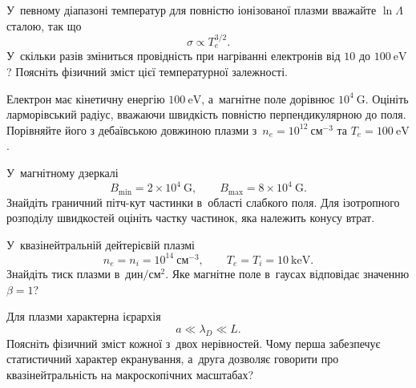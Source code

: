 \begin{problem}\label{prb:PlasmaConductivity}
	 У~певному діапазоні температур для повністю іонізованої плазми вважайте $\ln\Lambda$ сталою, так що
	\begin{equation*}
		\sigma\propto T_e^{3/2}.
	\end{equation*}
	У~скільки разів зміниться провідність при нагріванні електронів від $10$ до $100~\mathrm{eV}$? Поясніть фізичний зміст цієї температурної залежності.
\end{problem}

\begin{problem}\label{prb:PlasmaLarmor}
	 Електрон має кінетичну енергію $100~\mathrm{eV}$, а~магнітне поле дорівнює $10^4~\mathrm{G}$. Оцініть ларморівський радіус, вважаючи швидкість повністю перпендикулярною до поля. Порівняйте його з дебаївською довжиною плазми з~$n_e=10^{12}~\mathrm{см}^{-3}$ та $T_e=100~\mathrm{eV}$.
\end{problem}

\begin{problem}\label{prb:PlasmaMirror}
	 У~магнітному дзеркалі
	\begin{equation*}
		B_{\min}=2\times10^4~\mathrm{G},
		\qquad
		B_{\max}=8\times10^4~\mathrm{G}.
	\end{equation*}
	Знайдіть граничний пітч-кут частинки в~області слабкого поля. Для ізотропного розподілу швидкостей оцініть частку частинок, яка належить конусу втрат.
\end{problem}

\begin{problem}\label{prb:PlasmaBeta}
	 У~квазінейтральній дейтерієвій плазмі
	\begin{equation*}
		n_e=n_i=10^{14}~\mathrm{см}^{-3},
		\qquad
		T_e=T_i=10~\mathrm{keV}.
	\end{equation*}
	Знайдіть тиск плазми в~$\mathrm{дин/см^2}$. Яке магнітне поле в~гаусах відповідає значенню $\beta=1$?
\end{problem}

\begin{problem}\label{prb:PlasmaScales}
	 Для плазми характерна ієрархія
	\begin{equation*}
		a\ll\lambda_D\ll L.
	\end{equation*}
	Поясніть фізичний зміст кожної з~двох нерівностей. Чому перша забезпечує статистичний характер екранування, а~друга дозволяє говорити про квазінейтральність на макроскопічних масштабах?
\end{problem}



